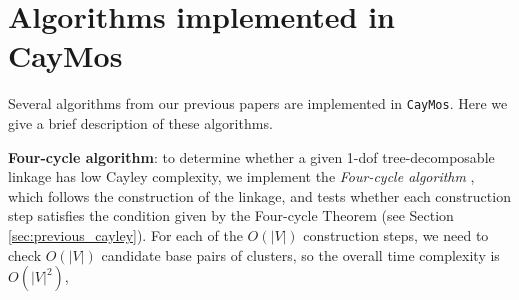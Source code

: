 \documentclass[prodmode,acmtoms]{acmsmall}
\begin{document}
\section{Algorithms implemented in CayMos}
\label{sec:algorithms}

Several algorithms from our previous papers  are implemented in \texttt{CayMos}. 
Here we give a brief description of these algorithms. 



\textbf{Four-cycle algorithm}: to determine whether a given 1-dof tree-decomposable linkage has low Cayley complexity, 
we implement the \emph{Four-cycle algorithm} \cite[Theorem 2]{Sitharam2011b},
which follows the construction of the linkage, and tests whether each construction step 
satisfies the condition given by the Four-cycle Theorem (see  Section \ref{sec:previous_cayley}).
For each of the $O(|V|)$ construction steps, we need to check $O(|V|)$ candidate base pairs of clusters, so
the overall time complexity is $O(|V|^2)$, 
\end{document}

